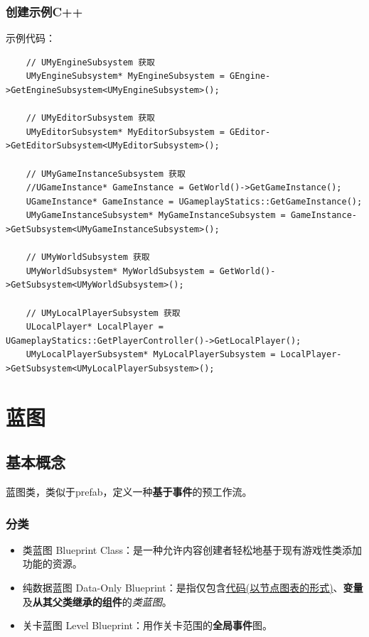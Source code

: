 \documentclass[UTF8,a4paper,12pt]{ctexbook}
\begin{document}
		\subsection{创建示例C++}
			示例代码：
			
			\begin{lstlisting}
	// UMyEngineSubsystem 获取 
	UMyEngineSubsystem* MyEngineSubsystem = GEngine->GetEngineSubsystem<UMyEngineSubsystem>();
	
	// UMyEditorSubsystem 获取
	UMyEditorSubsystem* MyEditorSubsystem = GEditor->GetEditorSubsystem<UMyEditorSubsystem>();
	
	// UMyGameInstanceSubsystem 获取
	//UGameInstance* GameInstance = GetWorld()->GetGameInstance();
	UGameInstance* GameInstance = UGameplayStatics::GetGameInstance();
	UMyGameInstanceSubsystem* MyGameInstanceSubsystem = GameInstance->GetSubsystem<UMyGameInstanceSubsystem>();
	
	// UMyWorldSubsystem 获取
	UMyWorldSubsystem* MyWorldSubsystem = GetWorld()->GetSubsystem<UMyWorldSubsystem>();
	
	// UMyLocalPlayerSubsystem 获取
	ULocalPlayer* LocalPlayer = UGameplayStatics::GetPlayerController()->GetLocalPlayer();
	UMyLocalPlayerSubsystem* MyLocalPlayerSubsystem = LocalPlayer->GetSubsystem<UMyLocalPlayerSubsystem>();		
			\end{lstlisting}
			

\chapter{蓝图}
	\section{基本概念}
	
		蓝图类，类似于prefab，定义一种\textbf{基于事件}的预工作流。
		
		\subsection{分类}
			
			\begin{itemize}
				\item 类蓝图 Blueprint Class：是一种允许内容创建者轻松地基于现有游戏性类添加功能的资源。
				\item 纯数据蓝图 Data-Only Blueprint：是指仅包含\underline{代码(以节点图表的形式)}、\textbf{变量}及\textbf{从其父类继承的组件}的\textit{类蓝图}。
				\item 关卡蓝图 Level Blueprint：用作关卡范围的\textbf{全局事件}图。
			\end{itemize}
		
\end{document}
